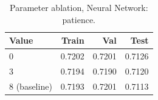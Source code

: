 \begin{table}[ht]
\centering
\small
\caption{Parameter ablation, Neural Network: patience.}
\label{tab:ablation-neural-patience}
\begin{tabular}{lrrr}
\toprule
Value & Train & Val & Test \\
\midrule
0 & 0.7202 & 0.7201 & 0.7126 \\
3 & 0.7194 & 0.7190 & 0.7120 \\
8 (baseline) & 0.7193 & 0.7201 & 0.7113 \\
\bottomrule
\end{tabular}
\end{table}


